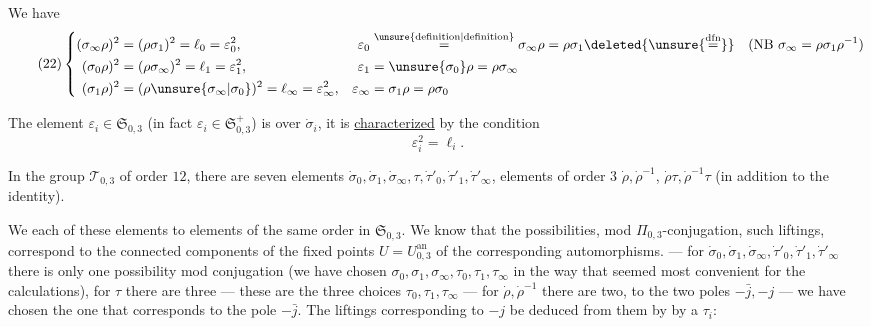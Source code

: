 

We have
\[
\tag{22}
\left\{\begin{aligned}
(\sigma_\infty\rho)^2&=(\rho\sigma_1)^2=\ell_0=\varepsilon_0^2,&
\varepsilon_0&\overset{\unsure{\text{definition}|\text{definition}}}{=}\sigma_\infty\rho=\rho\sigma_1\deleted{\unsure{\overset{\mathrm{dfn}}{=}}}
\quad(\mathrm{NB}\ \sigma_\infty=\rho\sigma_1\rho^{-1})\\
(\sigma_0\rho)^2&=(\rho\sigma_\infty)^2=\ell_1=\varepsilon_1^2,&
\varepsilon_1&=\unsure{\sigma_0}\rho=\rho\sigma_\infty\\
(\sigma_1\rho)^2&=(\rho\unsure{\sigma_\infty|\sigma_0})^2=\ell_\infty=\varepsilon_\infty^2,&
\varepsilon_\infty&=\sigma_1\rho=\rho\sigma_0
\end{aligned}\right.
\]

The element $\varepsilon_i\in\mathfrak S_{0,3}$
(in fact $\varepsilon_i\in\mathfrak S_{0,3}^{+}$) is over $\dot\sigma_i$,
it is \uline{characterized} by the condition
\[
\varepsilon_i^2=\ell_i.
\]

In the group $\mathcal T_{0,3}$ of order $12$, there are seven  elements
$\dot\sigma_0,\dot\sigma_1,\dot\sigma_\infty,\tau,\dot\tau'_0,\dot\tau'_1,\dot\tau'_\infty$,
  elements of order $3$
$\dot\rho,\dot\rho^{-1}$, 
$\dot\rho\tau,\dot\rho^{-1}\tau$ (in addition to the identity).

We   each of these elements to elements of the same order in
$\mathfrak S_{0,3}$.
We know that the possibilities, mod $\Pi_{0,3}$-conjugation,  such liftings,
correspond to the connected components of the fixed points  $U=U_{0,3}^{\mathrm{an}}$
of the corresponding  automorphisms. --- for
$\dot\sigma_0,\dot\sigma_1,\dot\sigma_\infty,\dot\tau'_0,\dot\tau'_1,\dot\tau'_\infty$
there is only one possibility mod conjugation (we have chosen
$\sigma_0,\sigma_1,\sigma_\infty,\tau_0,\tau_1,\tau_\infty$
in the way that seemed most convenient for the calculations),
for $\tau$ there are three --- these are the three choices $\tau_0,\tau_1,\tau_\infty$
--- for $\dot\rho,\dot\rho^{-1}$ there are two,
 to the two poles $-\bar j,-j$ --- we have chosen the one that
corresponds to the pole $-\bar j$.
The liftings corresponding to $-j$  be deduced from them by  by a $\tau_i$:

